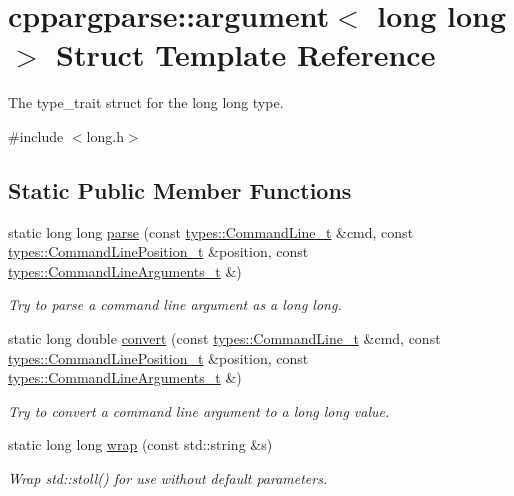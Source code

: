 \hypertarget{structcppargparse_1_1argument_3_01long_01long_01_4}{}\section{cppargparse\+:\+:argument$<$ long long $>$ Struct Template Reference}
\label{structcppargparse_1_1argument_3_01long_01long_01_4}


The type\+\_\+trait struct for the long long type.  




{\ttfamily \#include $<$long.\+h$>$}

\subsection*{Static Public Member Functions}
\begin{DoxyCompactItemize}
\item 
static long long \hyperlink{structcppargparse_1_1argument_3_01long_01long_01_4_af0db4c88264c00b9ad4647776a095be8}{parse} (const \hyperlink{types_8h_a80adf2418b7ce9fe616698efa7533ecf}{types\+::\+Command\+Line\+\_\+t} \&cmd, const \hyperlink{types_8h_a43b4f43f8940de1bf09ced6f1b668053}{types\+::\+Command\+Line\+Position\+\_\+t} \&position, const \hyperlink{types_8h_a003c660afe2ee9c6cc39aea966e8926d}{types\+::\+Command\+Line\+Arguments\+\_\+t} \&)
\begin{DoxyCompactList}\small\item\em Try to parse a command line argument as a long long. \end{DoxyCompactList}\item 
static long double \hyperlink{structcppargparse_1_1argument_3_01long_01long_01_4_a82782c8710b1270242d3746ea67bd73e}{convert} (const \hyperlink{types_8h_a80adf2418b7ce9fe616698efa7533ecf}{types\+::\+Command\+Line\+\_\+t} \&cmd, const \hyperlink{types_8h_a43b4f43f8940de1bf09ced6f1b668053}{types\+::\+Command\+Line\+Position\+\_\+t} \&position, const \hyperlink{types_8h_a003c660afe2ee9c6cc39aea966e8926d}{types\+::\+Command\+Line\+Arguments\+\_\+t} \&)
\begin{DoxyCompactList}\small\item\em Try to convert a command line argument to a long long value. \end{DoxyCompactList}\item 
static long long \hyperlink{structcppargparse_1_1argument_3_01long_01long_01_4_a0b626ce893c91192a7d9fd0acb7134f4}{wrap} (const std\+::string \&s)
\begin{DoxyCompactList}\small\item\em Wrap std\+::stoll() for use without default parameters. \end{DoxyCompactList}\end{DoxyCompactItemize}


